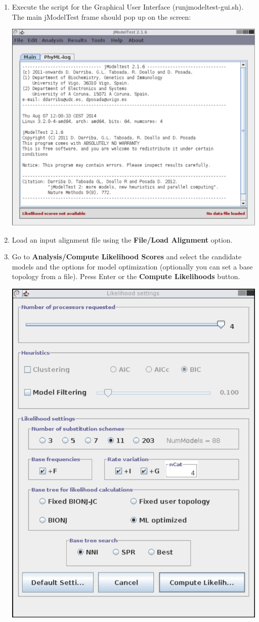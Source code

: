\begin{enumerate}
\item Execute the script for the Graphical User Interface (runjmodeltest-gui.sh). The main jModelTest frame should pop up on the screen:

\begin{center}
\includegraphics[width=.9\textwidth]{images/main-window.pdf}
\end{center}

\item Load an input alignment file using the {\bf File/Load Alignment} option.

\item Go to {\bf Analysis/Compute Likelihood Scores} and select the candidate models and the options for model optimization (optionally you can set a base topology from a file). Press Enter or the {\bf Compute Likelihoods} button.

\begin{center}
\includegraphics[width=.6\textwidth]{images/lkl-settings.pdf}
\end{center}


\end{enumerate}
